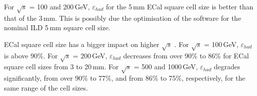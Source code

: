 \documentclass[a4paper,11pt]{article}
\newcommand{\rootS}{\ensuremath{\sqrt{s}} }
\begin{document}
For \rootS = 100 and 200\,GeV, $\varepsilon_{had}$ for the 5\,mm ECal square cell size is better than that of the 3\,mm. This is possibly due the optimisation of the software for the nominal ILD 5\,mm square cell size.

ECal square cell size has a bigger impact on higher \rootS. For \rootS = 100\,GeV, $\varepsilon_{had}$ is above 90\%. For \rootS = 200\,GeV, $\varepsilon_{had}$ decreases from over 90\% to 86\% for ECal square cell sizes from 3 to 20\,mm. For \rootS = 500 and 1000\,GeV, $\varepsilon_{had}$ degrades significantly, from over 90\% to 77\%,  and from 86\% to 75\%, respectively, for the same range of the cell sizes. 










\end{document}
